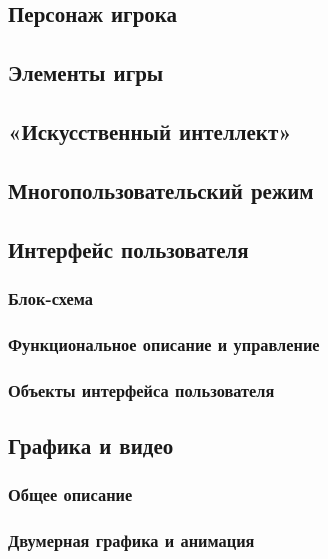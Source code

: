 \documentclass{article}
\begin{document}
\subsection{Персонаж игрока}

\subsection{Элементы игры}

\subsection{«Искусственный интеллект»}

\subsection{Многопользовательский режим}

\subsection{Интерфейс пользователя}

\subsubsection{Блок-схема}

\subsubsection{Функциональное описание и управление}

\subsubsection{Объекты интерфейса пользователя}

\subsection{Графика и видео}

\subsubsection{Общее описание}

\subsubsection{Двумерная графика и анимация}
\end{document}
